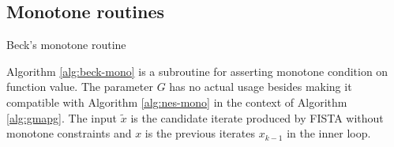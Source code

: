 \documentclass[12pt]{report}
\begin{document}
        \subsection{Monotone routines}
            \begin{algorithm}[H]
                \begin{algorithmic}[1]
                    \caption{Beck's monotone routine}\label{alg:beck-mono}
                \end{algorithmic}
            \end{algorithm}
            \par
            Algorithm \ref{alg:beck-mono} is a subroutine for asserting monotone condition on function value. 
            The parameter $G$ has no actual usage besides making it compatible with Algorithm \ref{alg:nes-mono} in the context of Algorithm \ref{alg:gmapg}. 
            The input $\tilde x$ is the candidate iterate produced by FISTA without monotone constraints and $x$ is the previous iterates $x_{k - 1}$ in the inner loop. 
\end{document}
